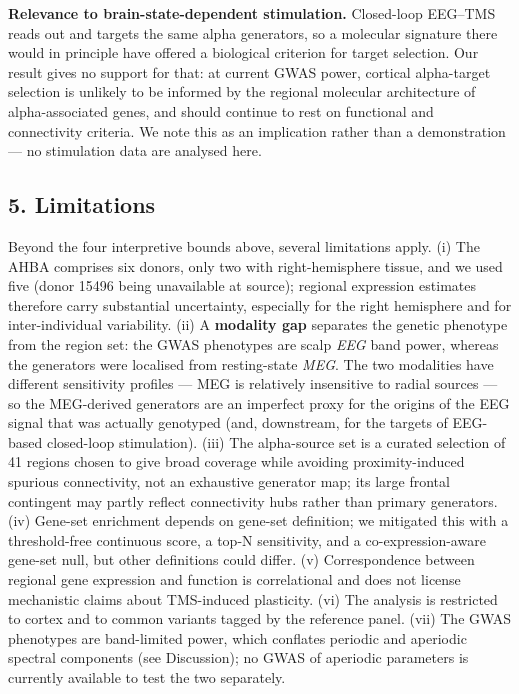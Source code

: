 \documentclass[
  11pt,
  letterpaper,
]{article}
\begin{document}
\textbf{Relevance to brain-state-dependent stimulation.} Closed-loop
EEG--TMS reads out and targets the same alpha generators, so a molecular
signature there would in principle have offered a biological criterion
for target selection. Our result gives no support for that: at current
GWAS power, cortical alpha-target selection is unlikely to be informed
by the regional molecular architecture of alpha-associated genes, and
should continue to rest on functional and connectivity criteria. We note
this as an implication rather than a demonstration --- no stimulation
data are analysed here.

\subsection{5. Limitations}\label{limitations}

Beyond the four interpretive bounds above, several limitations apply.
(i) The AHBA comprises six donors, only two with right-hemisphere
tissue, and we used five (donor 15496 being unavailable at source);
regional expression estimates therefore carry substantial uncertainty,
especially for the right hemisphere and for inter-individual
variability. (ii) A \textbf{modality gap} separates the genetic
phenotype from the region set: the GWAS phenotypes are scalp \emph{EEG}
band power, whereas the generators were localised from resting-state
\emph{MEG}. The two modalities have different sensitivity profiles ---
MEG is relatively insensitive to radial sources --- so the MEG-derived
generators are an imperfect proxy for the origins of the EEG signal that
was actually genotyped (and, downstream, for the targets of EEG-based
closed-loop stimulation). (iii) The alpha-source set is a curated
selection of 41 regions chosen to give broad coverage while avoiding
proximity-induced spurious connectivity, not an exhaustive generator
map; its large frontal contingent may partly reflect connectivity hubs
rather than primary generators. (iv) Gene-set enrichment depends on
gene-set definition; we mitigated this with a threshold-free continuous
score, a top-N sensitivity, and a co-expression-aware gene-set null, but
other definitions could differ. (v) Correspondence between regional gene
expression and function is correlational and does not license
mechanistic claims about TMS-induced plasticity. (vi) The analysis is
restricted to cortex and to common variants tagged by the reference
panel. (vii) The GWAS phenotypes are band-limited power, which conflates
periodic and aperiodic spectral components (see Discussion); no GWAS of
aperiodic parameters is currently available to test the two separately.
\end{document}
